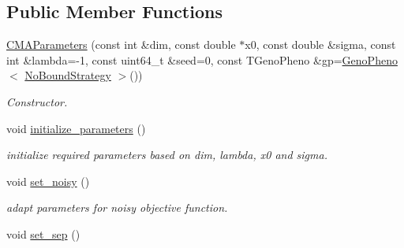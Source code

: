 \subsection*{Public Member Functions}
\begin{DoxyCompactItemize}
\item 
\hyperlink{classlibcmaes_1_1CMAParameters_a18d6039c0adffddd51caee1250b072bc}{C\-M\-A\-Parameters} (const int \&dim, const double $\ast$x0, const double \&sigma, const int \&lambda=-\/1, const uint64\-\_\-t \&seed=0, const T\-Geno\-Pheno \&gp=\hyperlink{classlibcmaes_1_1GenoPheno}{Geno\-Pheno}$<$ \hyperlink{classlibcmaes_1_1NoBoundStrategy}{No\-Bound\-Strategy} $>$())
\begin{DoxyCompactList}\small\item\em Constructor. \end{DoxyCompactList}\item 
\hypertarget{classlibcmaes_1_1CMAParameters_a0d963d4719d9b6447cddeeca542167a1}{void \hyperlink{classlibcmaes_1_1CMAParameters_a0d963d4719d9b6447cddeeca542167a1}{initialize\-\_\-parameters} ()}\label{classlibcmaes_1_1CMAParameters_a0d963d4719d9b6447cddeeca542167a1}

\begin{DoxyCompactList}\small\item\em initialize required parameters based on dim, lambda, x0 and sigma. \end{DoxyCompactList}\item 
\hypertarget{classlibcmaes_1_1CMAParameters_aa6dc1bafcff83e082db9146a923949d3}{void \hyperlink{classlibcmaes_1_1CMAParameters_aa6dc1bafcff83e082db9146a923949d3}{set\-\_\-noisy} ()}\label{classlibcmaes_1_1CMAParameters_aa6dc1bafcff83e082db9146a923949d3}

\begin{DoxyCompactList}\small\item\em adapt parameters for noisy objective function. \end{DoxyCompactList}\item 
\hypertarget{classlibcmaes_1_1CMAParameters_a1f2115c14728278a946c358d8d26f30c}{void \hyperlink{classlibcmaes_1_1CMAParameters_a1f2115c14728278a946c358d8d26f30c}{set\-\_\-sep} ()}\label{classlibcmaes_1_1CMAParameters_a1f2115c14728278a946c358d8d26f30c}


\end{DoxyCompactItemize}
